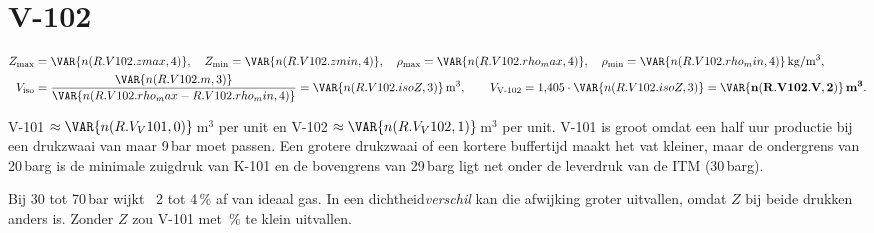\section{V-102}
\begin{align*}
Z_{\max} &= \VAR{n(R.V102.zmax,4)},\quad Z_{\min} = \VAR{n(R.V102.zmin,4)},\quad
\rho_{\max} = \VAR{n(R.V102.rho_max,4)},\quad \rho_{\min} = \VAR{n(R.V102.rho_min,4)}\,\mathrm{kg/m^3},\\
V_\mathrm{iso} &= \frac{\VAR{n(R.V102.m,3)}}{\VAR{n(R.V102.rho_max - R.V102.rho_min,4)}} = \VAR{n(R.V102.isoZ,3)}\,\mathrm{m^3},\qquad
V_{\text{V-102}} = 1{,}405\cdot\VAR{n(R.V102.isoZ,3)} = \mathbf{\VAR{n(R.V102.V,2)}\,m^3}.
\end{align*}
\begin{resultaat}
V-101 $\approx \VAR{n(R.V_V101,0)}$\,m$^3$ per unit en V-102 $\approx \VAR{n(R.V_V102,1)}$\,m$^3$ per unit. V-101 is groot
omdat een half uur productie bij een drukzwaai van maar 9\,bar moet passen. Een grotere drukzwaai of een kortere
buffertijd maakt het vat kleiner, maar de ondergrens van 20\,barg is de minimale zuigdruk van K-101 en de
bovengrens van 29\,barg ligt net onder de leverdruk van de ITM (30\,barg).
\end{resultaat}
\begin{waarom}[$Z$ meenemen]
Bij 30 tot 70\,bar wijkt \HH\ 2 tot 4\,\% af van ideaal gas. In een dichtheid\emph{verschil} kan die afwijking groter
uitvallen, omdat $Z$ bij beide drukken anders is. Zonder $Z$ zou V-101 met
\,\% te klein
uitvallen.
\end{waarom}
